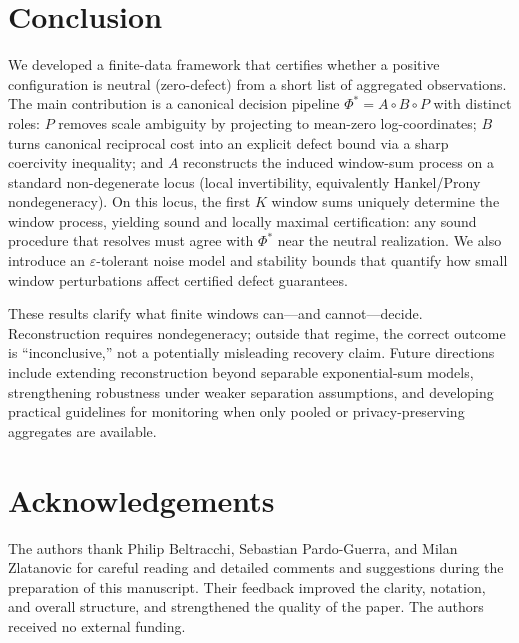 \documentclass[11pt,reqno]{amsart}
\theoremstyle{definition}
\theoremstyle{remark}
\newcommand{\1}{\mathbf{1}}
\begin{document}
\section*{Conclusion}
We developed a finite-data framework that certifies whether a positive configuration is neutral (zero-defect) from a short list of aggregated observations. The main contribution is a canonical decision pipeline $\Phi^\ast=A\circ B\circ P$ with distinct roles: $P$ removes scale ambiguity by projecting to mean-zero log-coordinates; $B$ turns canonical reciprocal cost into an explicit defect bound via a sharp coercivity inequality; and $A$ reconstructs the induced window-sum process on a standard non-degenerate locus (local invertibility, equivalently Hankel/Prony nondegeneracy). On this locus, the first $K$ window sums uniquely determine the window process, yielding sound and locally maximal certification: any sound procedure that resolves must agree with $\Phi^\ast$ near the neutral realization. We also introduce an $\varepsilon$-tolerant noise model and stability bounds that quantify how small window perturbations affect certified defect guarantees.

These results clarify what finite windows can—and cannot—decide. Reconstruction requires nondegeneracy; outside that regime, the correct outcome is “inconclusive,” not a potentially misleading recovery claim. Future directions include extending reconstruction beyond separable exponential-sum models, strengthening robustness under weaker separation assumptions, and developing practical guidelines for monitoring when only pooled or privacy-preserving aggregates are available.



\section*{Acknowledgements}
The authors thank Philip Beltracchi, Sebastian Pardo-Guerra, and Milan Zlatanovic for careful reading and detailed comments and suggestions during the preparation of this manuscript. Their feedback improved the clarity, notation, and overall structure, and strengthened the quality of the paper. The authors received no external funding.
\end{document}
